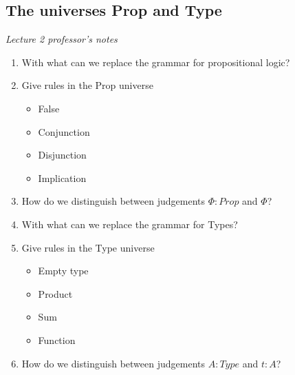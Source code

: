 \documentclass[fleqn]{article}
\begin{document}
\subsection{The universes Prop and Type}
\textit{Lecture 2 professor's notes}
\begin{enumerate}
    \item With what can we replace the grammar for propositional logic? 
    \item Give rules in the Prop universe
    \begin{itemize}
        \item False
        \item Conjunction
        \item Disjunction
        \item Implication
    \end{itemize}
    \item How do we distinguish between judgements $\Phi : Prop$ and $\Phi$?
    \item With what can we replace the grammar for Types? 
    \item Give rules in the Type universe 
    \begin{itemize}
        \item Empty type
        \item Product
        \item Sum
        \item Function
    \end{itemize}
    \item How do we distinguish between judgements $A : Type$ and $t : A$?
\end{enumerate}
\end{document}
